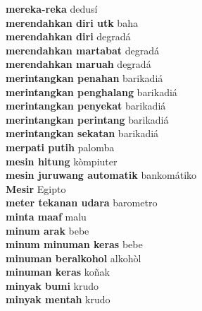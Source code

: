 \textbf{ mereka-reka  } dedusí \\
\textbf{ merendahkan diri utk  } baha \\
\textbf{ merendahkan diri  } degradá \\
\textbf{ merendahkan martabat  } degradá \\
\textbf{ merendahkan maruah  } degradá \\
\textbf{ merintangkan penahan  } barikadiá \\
\textbf{ merintangkan penghalang  } barikadiá \\
\textbf{ merintangkan penyekat  } barikadiá \\
\textbf{ merintangkan perintang  } barikadiá \\
\textbf{ merintangkan sekatan  } barikadiá \\
\textbf{ merpati putih  } palomba \\
\textbf{ mesin hitung  } kòmpiuter \\
\textbf{ mesin juruwang automatik  } bankomátiko \\
\textbf{ Mesir  } Egipto \\
\textbf{ meter tekanan udara  } barometro \\
\textbf{ minta maaf  } malu \\
\textbf{ minum arak  } bebe \\
\textbf{ minum minuman keras  } bebe \\
\textbf{ minuman beralkohol  } alkohòl \\
\textbf{ minuman keras  } koñak \\
\textbf{ minyak bumi  } krudo \\
\textbf{ minyak mentah  } krudo \\
